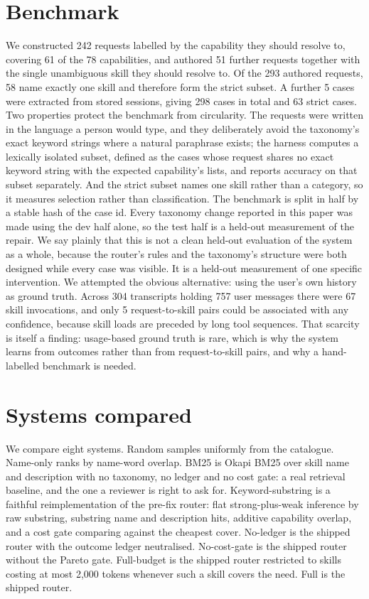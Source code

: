 \documentclass[sigconf,acmsmall]{acmart}
\begin{document}
\section{Benchmark}
We constructed 242 requests labelled by the capability they should resolve to, covering 61 of the 78 capabilities, and authored 51 further requests together with the single unambiguous skill they should resolve to. Of the 293 authored requests, 58 name exactly one skill and therefore form the strict subset. A further 5 cases were extracted from stored sessions, giving 298 cases in total and 63 strict cases.
Two properties protect the benchmark from circularity. The requests were written in the language a person would type, and they deliberately avoid the taxonomy's exact keyword strings where a natural paraphrase exists; the harness computes a lexically isolated subset, defined as the cases whose request shares no exact keyword string with the expected capability's lists, and reports accuracy on that subset separately. And the strict subset names one skill rather than a category, so it measures selection rather than classification.
The benchmark is split in half by a stable hash of the case id. Every taxonomy change reported in this paper was made using the dev half alone, so the test half is a held-out measurement of the repair. We say plainly that this is not a clean held-out evaluation of the system as a whole, because the router's rules and the taxonomy's structure were both designed while every case was visible. It is a held-out measurement of one specific intervention.
We attempted the obvious alternative: using the user's own history as ground truth. Across 304 transcripts holding 757 user messages there were 67 skill invocations, and only 5 request-to-skill pairs could be associated with any confidence, because skill loads are preceded by long tool sequences. That scarcity is itself a finding: usage-based ground truth is rare, which is why the system learns from outcomes rather than from request-to-skill pairs, and why a hand-labelled benchmark is needed.

\section{Systems compared}
We compare eight systems. Random samples uniformly from the catalogue. Name-only ranks by name-word overlap. BM25 is Okapi BM25 over skill name and description with no taxonomy, no ledger and no cost gate: a real retrieval baseline, and the one a reviewer is right to ask for. Keyword-substring is a faithful reimplementation of the pre-fix router: flat strong-plus-weak inference by raw substring, substring name and description hits, additive capability overlap, and a cost gate comparing against the cheapest cover. No-ledger is the shipped router with the outcome ledger neutralised. No-cost-gate is the shipped router without the Pareto gate. Full-budget is the shipped router restricted to skills costing at most 2,000 tokens whenever such a skill covers the need. Full is the shipped router.
\end{document}

